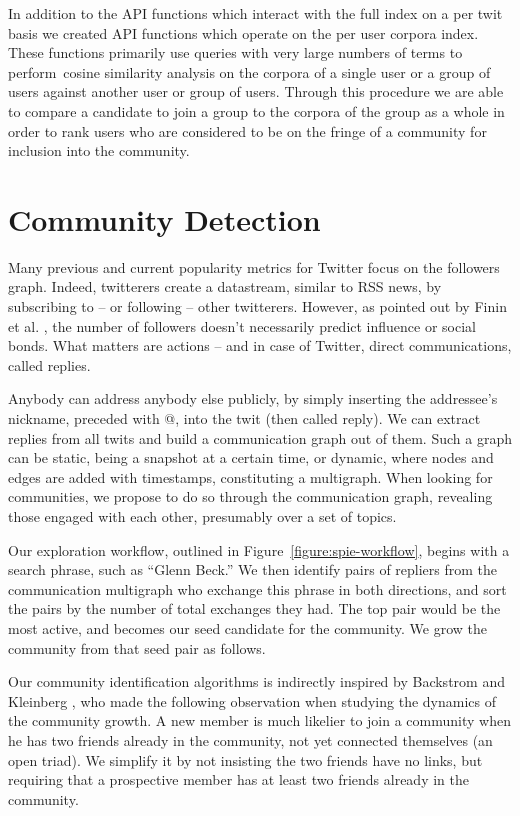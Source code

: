 \documentclass[10pt,oneside]{memoir}
\begin{document}
In addition to the API functions which interact with the full index
on a per twit basis we created API functions which operate on the
per user corpora index. These functions primarily use queries with
very large numbers of terms to perform~cosine similarity analysis
on the corpora of a single user or a group of users against another
user or group of users. Through this procedure we are able to
compare a candidate to join a group to the corpora of the group as
a whole in order to rank users who are considered to be on the
fringe of a community for inclusion into the community.


\pagebreak \section{Community Detection}
\label{communitydetection}

Many previous and current popularity metrics for Twitter focus on
the followers graph. Indeed, twitterers create a datastream,
similar to RSS news, by subscribing to -- or following -- other
twitterers. However, as pointed out by Finin et al.
\cite{DBLP:conf/kdd/JavaSFT07}, the number of followers doesn't
necessarily predict influence or social bonds. What matters are
actions -- and in case of Twitter, direct communications, called
replies.


Anybody can address anybody else publicly, by simply inserting the
addressee's nickname, preceded with @, into the twit (then called
reply). We can extract replies from all twits and build a
communication graph out of them. Such a graph can be static, being
a snapshot at a certain time, or dynamic, where nodes and edges are
added with timestamps, constituting a multigraph. When looking for
communities, we propose to do so through the communication graph,
revealing those engaged with each other, presumably over a set of
topics.


Our exploration workflow, outlined in Figure~\ref{figure:spie-workflow},
begins with a search phrase, such as ``Glenn Beck.'' We then identify
pairs of repliers from the communication multigraph who exchange
this phrase in both directions, and sort the pairs by the number of
total exchanges they had. The top pair would be the most active,
and becomes our seed candidate for the community. We grow the
community from that seed pair as follows.


Our community identification algorithms is indirectly inspired by
Backstrom and Kleinberg \cite{DBLP:conf/kdd/BackstromHKL06}, who made
the following observation when studying the dynamics of the
community growth. A new member is much likelier to join a community
when he has two friends already in the community, not yet connected
themselves (an open triad). We simplify it by not insisting the two
friends have no links, but requiring that a prospective member has
at least two friends already in the community.
\end{document}
